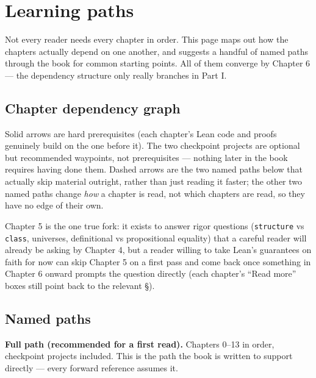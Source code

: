 \chapter*{Learning paths}
\setcounter{section}{0}\label{sec:root:learning-paths:1}

Not every reader needs every chapter in order. This page maps out how the chapters actually depend on one another, and suggests a handful of named paths through the book for common starting points. All of them converge by Chapter 6 --- the dependency structure only really branches in Part I.

\section*{Chapter dependency graph}
\label{sec:root:learning-paths:2}

\begin{center}

\end{center}

Solid arrows are hard prerequisites (each chapter's Lean code and proofs genuinely build on the one before it). The two checkpoint projects are optional but recommended waypoints, not prerequisites --- nothing later in the book requires having done them. Dashed arrows are the two named paths below that actually skip material outright, rather than just reading it faster; the other two named paths change \emph{how} a chapter is read, not which chapters are read, so they have no edge of their own.

Chapter 5 is the one true fork: it exists to answer rigor questions (\texttt{structure} vs \texttt{class}, universes, definitional vs propositional equality) that a careful reader will already be asking by Chapter 4, but a reader willing to take Lean's guarantees on faith for now can skip Chapter 5 on a first pass and come back once something in Chapter 6 onward prompts the question directly (each chapter's ``Read more'' boxes still point back to the relevant §).

\section*{Named paths}
\label{sec:root:learning-paths:3}

\textbf{Full path (recommended for a first read).} Chapters 0--13 in order, checkpoint projects included. This is the path the book is written to support directly --- every forward reference assumes it.

